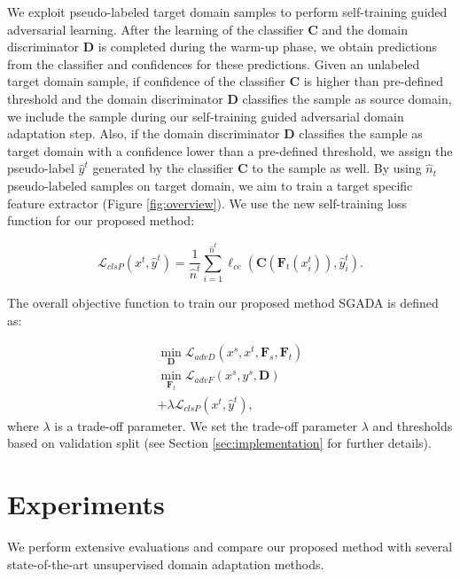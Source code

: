 \documentclass[final]{cvpr}
\begin{document}
We exploit pseudo-labeled target domain samples to perform self-training guided adversarial learning. After the learning of the classifier $ \mathbf{C} $ and the domain discriminator $ \mathbf{D} $ is completed during the warm-up phase, we obtain predictions from the classifier and confidences for these predictions. Given an unlabeled target domain sample, if confidence of the classifier $ \mathbf{C} $ is higher than pre-defined threshold and the domain discriminator $ \mathbf{D} $ classifies the sample as source domain, we include the sample during our self-training guided adversarial domain adaptation step. Also, if the domain discriminator $ \mathbf{D} $ classifies the sample as target domain with a confidence lower than a pre-defined threshold, we assign the pseudo-label $ \hat{y}^t $ generated by the classifier $ \mathbf{C} $ to the sample as well. By using $ \hat{n}_t $ pseudo-labeled samples on target domain, we aim to train a target specific feature extractor (Figure \ref{fig:overview}). We use the new self-training loss function for our proposed method:

\begin{equation}
    \mathcal{L}_{clsP}(x^t, \hat{y}^t) = \frac{1}{\hat{n}^t}\sum_{i=1}^{\hat{n}^t}\ell_{ce}(\mathbf{C}(\mathbf{F}_t(x_i^t)), \hat{y}_i^t).
\end{equation}

The overall objective function to train our proposed method SGADA is defined as:

\begin{equation}
\label{eq:allobj}
\begin{aligned}
    \min_{\mathbf{D}}\mathcal{L}_{advD}(x^s, x^t, \mathbf{F}_s, \mathbf{F}_t) 
    \\\min_{\mathbf{F}_t}\mathcal{L}_{advF}(x^s, y^s, \mathbf{D})
    \\+\lambda\mathcal{L}_{clsP}(x^t, \hat{y}^t),
\end{aligned}
\end{equation}
where $ \lambda $ is a trade-off parameter. We set the trade-off parameter $ \lambda $ and thresholds based on validation split (see Section \ref{sec:implementation} for further details).

\section{Experiments}
\label{sec:experiments}

We perform extensive evaluations and compare our proposed method with several state-of-the-art unsupervised domain adaptation methods.
\end{document}
